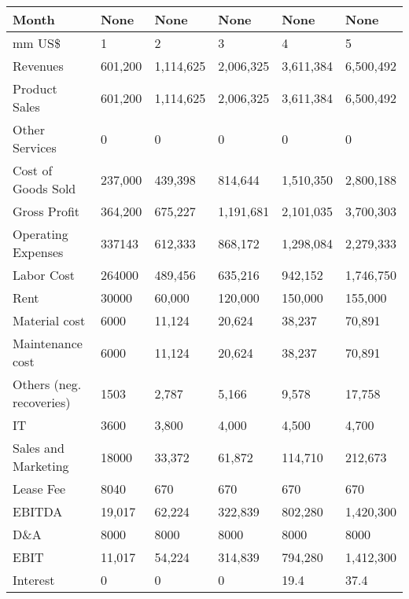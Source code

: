 \begin{tabular}{llllll}
\hline
 Month                    & None    & None      & None      & None      & None      \\
\hline
 mm US\$                   & 1       & 2         & 3         & 4         & 5         \\
 Revenues                 & 601,200 & 1,114,625 & 2,006,325 & 3,611,384 & 6,500,492 \\
 Product Sales            & 601,200 & 1,114,625 & 2,006,325 & 3,611,384 & 6,500,492 \\
 Other Services           & 0       & 0         & 0         & 0         & 0         \\
 Cost of Goods Sold       & 237,000 & 439,398   & 814,644   & 1,510,350 & 2,800,188 \\
 Gross Profit             & 364,200 & 675,227   & 1,191,681 & 2,101,035 & 3,700,303 \\
 Operating Expenses       & 337143  & 612,333   & 868,172   & 1,298,084 & 2,279,333 \\
 Labor Cost               & 264000  & 489,456   & 635,216   & 942,152   & 1,746,750 \\
 Rent                     & 30000   & 60,000    & 120,000   & 150,000   & 155,000   \\
 Material cost            & 6000    & 11,124    & 20,624    & 38,237    & 70,891    \\
 Maintenance cost         & 6000    & 11,124    & 20,624    & 38,237    & 70,891    \\
 Others (neg. recoveries) & 1503    & 2,787     & 5,166     & 9,578     & 17,758    \\
 IT                       & 3600    & 3,800     & 4,000     & 4,500     & 4,700     \\
 Sales and Marketing      & 18000   & 33,372    & 61,872    & 114,710   & 212,673   \\
 Lease Fee                & 8040    & 670       & 670       & 670       & 670       \\
 EBITDA                   & 19,017  & 62,224    & 322,839   & 802,280   & 1,420,300 \\
 D\&A                      & 8000    & 8000      & 8000      & 8000      & 8000      \\
 EBIT                     & 11,017  & 54,224    & 314,839   & 794,280   & 1,412,300 \\
 Interest                 & 0       & 0         & 0         & 19.4      & 37.4      \\

\end{tabular}
